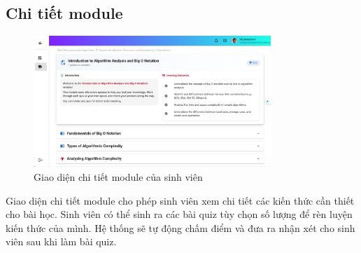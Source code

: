 \subsection{Chi tiết module}
\begin{figure}[H]
    \centering
    \includegraphics[width=0.8\textwidth]{images/CapScreen_Student/ModuleDetail.png}
    \caption{Giao diện chi tiết module của sinh viên}
    \label{fig:module_detail_page}
\end{figure}
Giao diện chi tiết module cho phép sinh viên xem chi tiết các kiến thức cần thiết cho bài học. Sinh viên có thể sinh ra các bài quiz tùy chọn số lượng để rèn luyện kiến thức của mình. Hệ thống sẽ tự động chấm điểm và đưa ra nhận xét cho sinh viên sau khi làm bài quiz.
